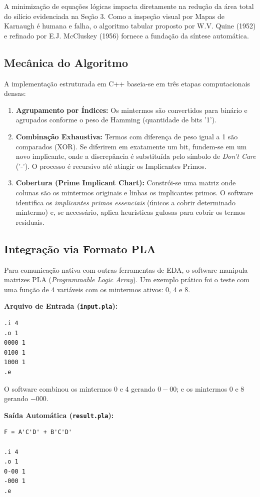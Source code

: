 \documentclass[conference]{IEEEtran}
\begin{document}
A minimização de equações lógicas impacta diretamente na redução da área total do silício evidenciada na Seção 3. Como a inspeção visual por Mapas de Karnaugh é humana e falha, o algoritmo tabular proposto por W.V. Quine (1952) e refinado por E.J. McCluskey (1956) fornece a fundação da síntese automática.

\subsection{Mecânica do Algoritmo}
A implementação estruturada em C++ baseia-se em três etapas computacionais densas:
\begin{enumerate}
    \item \textbf{Agrupamento por Índices:} Os mintermos são convertidos para binário e agrupados conforme o peso de Hamming (quantidade de bits '1').
    \item \textbf{Combinação Exhaustiva:} Termos com diferença de peso igual a 1 são comparados (XOR). Se diferirem em exatamente um bit, fundem-se em um novo implicante, onde a discrepância é substituída pelo símbolo de \textit{Don't Care} ('-'). O processo é recursivo até atingir os Implicantes Primos.
    \item \textbf{Cobertura (Prime Implicant Chart):} Constrói-se uma matriz onde colunas são os mintermos originais e linhas os implicantes primos. O software identifica os \textit{implicantes primos essenciais} (únicos a cobrir determinado mintermo) e, se necessário, aplica heurísticas gulosas para cobrir os termos residuais.
\end{enumerate}

\subsection{Integração via Formato PLA}
Para comunicação nativa com outras ferramentas de EDA, o software manipula matrizes PLA (\textit{Programmable Logic Array}). Um exemplo prático foi o teste com uma função de 4 variáveis com os mintermos ativos: 0, 4 e 8.

\noindent\textbf{Arquivo de Entrada (\texttt{input.pla}):}
\begin{lstlisting}[style=codeStyle]
.i 4
.o 1
0000 1
0100 1
1000 1
.e
\end{lstlisting}

O software combinou os mintermos 0 e 4 gerando $0-00$; e os mintermos 0 e 8 gerando $-000$.

\noindent\textbf{Saída Automática (\texttt{result.pla}):}
\begin{lstlisting}[style=codeStyle]
F = A'C'D' + B'C'D'

.i 4
.o 1
0-00 1
-000 1
.e
\end{lstlisting}
\end{document}
